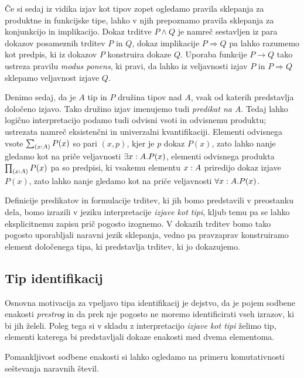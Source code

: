 Če si sedaj iz vidika izjav kot tipov zopet ogledamo pravila sklepanja za produktne in
funkcijske tipe, lahko v njih prepoznamo
pravila sklepanja za konjunkcijo in implikacijo. Dokaz trditve \(P \wedge Q\) je namreč sestavljen
iz para dokazov posameznih trditev \(P\) in \(Q\), dokaz implikacije \(P \Rightarrow Q\) pa lahko razumemo
kot predpis, ki iz dokazov \(P\) konstruira dokaze \(Q\). Uporaba funkcije \(P \to Q\)
tako ustreza pravilu \emph{modus ponens}, ki pravi, da lahko iz veljavnosti izjav \(P\) in \(P \Rightarrow Q\)
sklepamo veljavnost izjave \(Q\).

Denimo sedaj, da je \(A\) tip in \(P\) družina tipov nad \(A\), vsak od katerih predstavlja določeno
izjavo. Tako družino izjav imenujemo tudi \emph{predikat na A}.
Tedaj lahko logično interpretacijo podamo tudi odvisni vsoti in odvisnemu produktu;
ustrezata namreč eksistenčni in univerzalni kvantifikaciji. Elementi odvisnega vsote
\(\textstyle \sum_{\left( x : A \right)} P(x)\) so pari \((x, p)\), kjer je \(p\) dokaz \(P(x)\), zato lahko nanje gledamo
kot na priče veljavnosti \(\exists x : A. P(x)\), elementi odvisnega produkta
\(\textstyle \prod_{\left( x : A \right)} P(x)\) pa so predpisi, ki vsakemu elementu \(x : A\) priredijo
dokaz izjave \(P(x)\), zato lahko nanje gledamo kot na priče veljavnosti
\(\forall x : A.P(x)\).

Definicije predikatov in formulacije trditev, ki jih bomo predstavili v preostanku dela, bomo
izrazili v jeziku interpretacije \emph{izjave kot tipi}, kljub temu pa se lahko eksplicitnemu
zapisu prič pogosto izognemo. V dokazih trditev bomo tako pogosto uporabljali naravni
jezik sklepanja, vedno pa pravzaprav konstruiramo element določenega tipa, ki predstavlja trditev, ki jo dokazujemo.

\subsection{Tip identifikacij}
Osnovna motivacija za vpeljavo tipa identifikacij je dejstvo, da je pojem sodbene enakosti
\emph{prestrog} in da prek nje pogosto ne moremo identificirati vseh izrazov, ki bi
jih želeli. Poleg tega si v skladu z interpretacijo \emph{izjave kot tipi} želimo tip, elementi
katerega bi predstavljali dokaze enakosti med dvema elementoma.

Pomankljivost sodbene enakosti si lahko ogledamo na primeru komutativnosti seštevanja naravnih števil.

